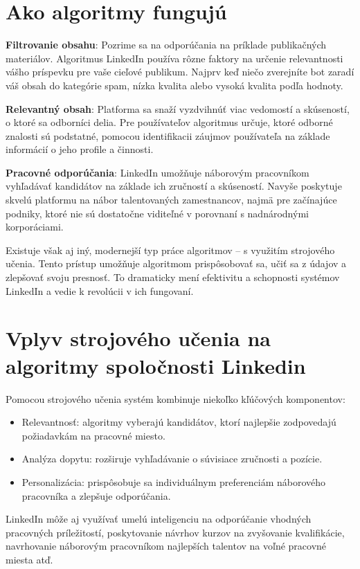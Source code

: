 \documentclass[slovak,a4paper]{coursepaper}
\begin{document}
\section{Ako algoritmy fungujú} \label{fungovanie}
\textbf{Filtrovanie obsahu}: Pozrime sa na odporúčania na príklade publikačných materiálov. Algoritmus LinkedIn používa rôzne faktory na určenie relevantnosti vášho príspevku pre vaše cieľové publikum. Najprv keď niečo zverejníte bot zaradí váš obsah do kategórie spam, nízka kvalita alebo vysoká kvalita podľa hodnoty.~\cite{4}

\textbf{Relevantný obsah}: Platforma sa snaží vyzdvihnúť viac vedomostí a skúseností, o ktoré sa odborníci delia. Pre používateľov algoritmus určuje, ktoré odborné znalosti sú podstatné, pomocou identifikacii záujmov používateľa na základe informácií o jeho profile a činnosti.~\cite{5}

\textbf{Pracovné odporúčania}: LinkedIn umožňuje náborovým pracovníkom vyhľadávať kandidátov na základe ich zručností a skúseností. Navyše poskytuje skvelú platformu na nábor talentovaných zamestnancov, najmä pre začínajúce podniky, ktoré nie sú dostatočne viditeľné v porovnaní s nadnárodnými korporáciami.~\cite{6}

Existuje však aj iný, modernejší typ práce algoritmov – s využitím strojového učenia. Tento prístup umožňuje algoritmom prispôsobovať sa, učiť sa z údajov a zlepšovať svoju presnosť. To dramaticky mení efektivitu a schopnosti systémov LinkedIn a vedie k revolúcii v ich fungovaní.

\section{Vplyv strojového učenia na algoritmy spoločnosti Linkedin} \label{strojové učenie}
Pomocou strojového učenia systém kombinuje niekoľko kľúčových komponentov:
\begin{itemize}
	\item Relevantnosť: algoritmy vyberajú kandidátov, ktorí najlepšie zodpovedajú požiadavkám na pracovné miesto.
	\item Analýza dopytu: rozširuje vyhľadávanie o súvisiace zručnosti a pozície.
	\item Personalizácia: prispôsobuje sa individuálnym preferenciám náborového pracovníka a zlepšuje odporúčania.
\end{itemize}

LinkedIn môže aj využívať umelú inteligenciu na odporúčanie vhodných pracovných príležitostí, poskytovanie návrhov kurzov na zvyšovanie kvalifikácie, navrhovanie náborovým pracovníkom najlepších talentov na voľné pracovné miesta atď.~\cite{7}
\end{document}
